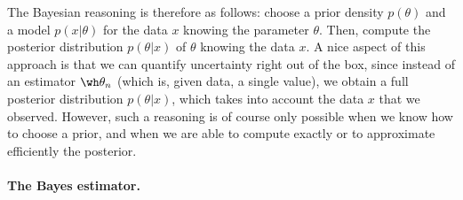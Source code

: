 The Bayesian reasoning is therefore as follows: choose a prior density $p(\theta)$ and a model $p(x | \theta)$ for the data $x$ knowing the parameter $\theta$.
Then, compute%
%
the posterior distribution $p(\theta | x)$ of $\theta$ knowing the data $x$. 
A nice aspect of this approach is that we can quantify uncertainty right out of the box, since instead of an estimator $\wh \theta_n$ (which is, given data, a single value), we obtain a full posterior distribution $p(\theta | x)$, which takes into account the data $x$ that we observed.
However, such a reasoning is of course only possible when we know how to choose a prior, and when we are able to compute exactly or to approximate efficiently the posterior.

\paragraph{The Bayes estimator.} %





